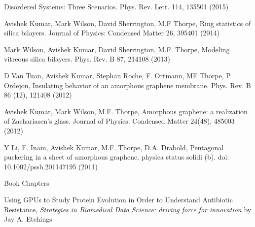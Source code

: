 \begin{cventries}
{\begin{cvitems}
Disordered Systems: Three Scenarios. Phys. Rev. Lett. 114, 135501 (2015)
    \item Avishek Kumar, Mark Wilson, David Sherrington, M.F Thorpe, Ring statistics of silica bilayers.
Journal of Physics: Condensed Matter 26, 395401 (2014)
    \item Mark Wilson, Avishek Kumar, David Sherrington, M.F. Thorpe, Modeling vitreous silica bilayers.
Phys. Rev. B 87, 214108 (2013)
    \item D Van Tuan, Avishek Kumar, Stephan Roche, F. Ortmann, MF Thorpe, P Ordejon, Insulating behavior
of an amorphous graphene membrane. Phys. Rev. B 86 (12), 121408 (2012)
    \item Avishek Kumar, Mark Wilson, M.F. Thorpe, Amorphous graphene: a realization of Zachariasen’s
glass. Journal of Physics: Condensed Matter 24(48), 485003 (2012)
    \item Y Li, F. Inam, Avishek Kumar, M.F. Thorpe, D.A. Drabold, Pentagonal puckering in a sheet of
amorphous graphene. physica status solidi (b). doi: 10.1002/pssb.201147195 (2011)
\end{cvitems}
}

\cventry{}
    {Book Chapters}
    {}
    {}
    {\begin{cvitems}
    \setlength\itemsep{1em}
    \item Using GPUs to Study Protein Evolution in Order to Understand Antibiotic Resistance, \textit{Strategies in Biomedical Data Science: driving force for innovation} by Jay A. Etchings
\end{cvitems}}




\end{cventries}
